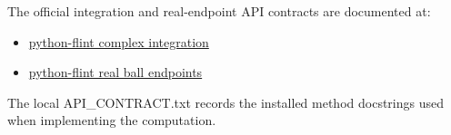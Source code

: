 The official integration and real-endpoint API contracts are documented at:

\begin{itemize}
\tightlist
\item
  \href{https://python-flint.readthedocs.io/en/latest/acb.html\#flint.acb.integral}{python-flint complex integration}
\item
  \href{https://python-flint.readthedocs.io/en/latest/arb.html}{python-flint real ball endpoints}
\end{itemize}

The local API\_CONTRACT.txt records the installed method docstrings used when implementing the computation.

